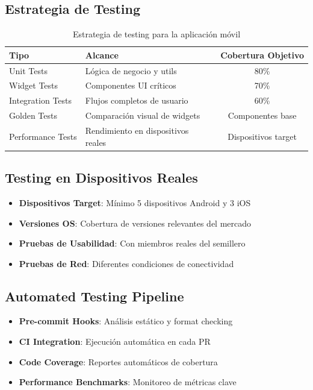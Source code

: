 \documentclass[12pt]{article}
\begin{document}
\subsection{Estrategia de Testing}
\begin{table}[H]
\centering
\begin{tabularx}{\textwidth}{|l|X|c|}
\hline
\textbf{Tipo} & \textbf{Alcance} & \textbf{Cobertura Objetivo} \\
\hline
Unit Tests & Lógica de negocio y utils & 80\% \\
\hline
Widget Tests & Componentes UI críticos & 70\% \\
\hline
Integration Tests & Flujos completos de usuario & 60\% \\
\hline
Golden Tests & Comparación visual de widgets & Componentes base \\
\hline
Performance Tests & Rendimiento en dispositivos reales & Dispositivos target \\
\hline
\end{tabularx}
\caption{Estrategia de testing para la aplicación móvil}
\end{table}

\subsection{Testing en Dispositivos Reales}
\begin{itemize}
    \item \textbf{Dispositivos Target}: Mínimo 5 dispositivos Android y 3 iOS
    \item \textbf{Versiones OS}: Cobertura de versiones relevantes del mercado
    \item \textbf{Pruebas de Usabilidad}: Con miembros reales del semillero
    \item \textbf{Pruebas de Red}: Diferentes condiciones de conectividad
\end{itemize}

\subsection{Automated Testing Pipeline}
\begin{itemize}
    \item \textbf{Pre-commit Hooks}: Análisis estático y format checking
    \item \textbf{CI Integration}: Ejecución automática en cada PR
    \item \textbf{Code Coverage}: Reportes automáticos de cobertura
    \item \textbf{Performance Benchmarks}: Monitoreo de métricas clave
\end{itemize}
\end{document}
